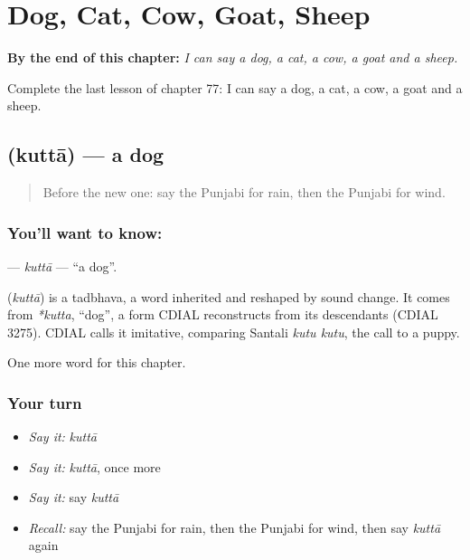 
\chapter{Dog, Cat, Cow, Goat, Sheep}
\label{ch:pa-dog-cat-cow-goat-sheep}

\begin{chapteropening}
\textbf{By the end of this chapter:} \emph{I can say a dog, a cat, a cow, a goat and a sheep.}

Complete the last lesson of chapter 77: I can say a dog, a cat, a cow, a goat and a sheep.
\end{chapteropening}

\section[\texorpdfstring{\pa{ਕੁੱਤਾ} (kuttā)}{ਕੁੱਤਾ (kuttā)}]{ (kuttā) — a dog}

\label{lesson:PA-C77-kutta}



\begin{quote}
Before the new one: say the Punjabi for rain, then the Punjabi for wind.
\end{quote}

\subsection*{You'll want to know: }
\textbf{} — \emph{kuttā} — \textquotedblleft{}a dog\textquotedblright{}.

\begin{cousinweb}
\textbf{} (\emph{kuttā}) is a tadbhava, a word inherited and reshaped by sound change. It comes from \emph{*kutta}, \textquotedblleft{}dog\textquotedblright{}, a form CDIAL reconstructs from its descendants (CDIAL 3275). CDIAL calls it imitative, comparing Santali \emph{kutu kutu}, the call to a puppy.
\end{cousinweb}

\begin{grammarlens}[title={What you've built}]
One more word for this chapter.
\end{grammarlens}

\subsection*{Your turn}
\begin{itemize}
\raggedright
  \item \emph{Say it:} \emph{kuttā}
  \item \emph{Say it:} \emph{kuttā}, once more
  \item \emph{Say it:} say \emph{kuttā}
  \item \emph{Recall:} say the Punjabi for rain, then the Punjabi for wind, then say \emph{kuttā} again
\end{itemize}

